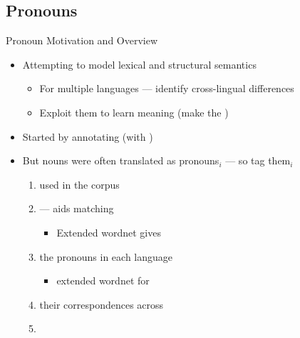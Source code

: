 \documentclass{beamer}
\begin{document}
\subsection{Pronouns}


  \begin{frame}{Pronoun Motivation and Overview}

    \begin{itemize}
    \item Attempting to model lexical and structural semantics
    \begin{itemize}
    \item For multiple languages --- identify cross-lingual differences
    \item Exploit them to learn meaning (make the  )
    \end{itemize}
  \item Started by annotating  (with )
    \item But  nouns were often translated as pronouns$_i$ 
      --- so tag them$_i$
      \begin{enumerate}
      \item {} used in the corpus
      \item {} --- aids matching 
        \begin{itemize}
        \item Extended wordnet gives 
        \end{itemize}
      \item {} the pronouns  in each language
        \begin{itemize}
        \item {} extended wordnet for 
        \end{itemize}
      \item {} their correspondences across 
      \item {}
      \end{enumerate}
    \end{itemize}
  \end{frame}
  
\end{document}

